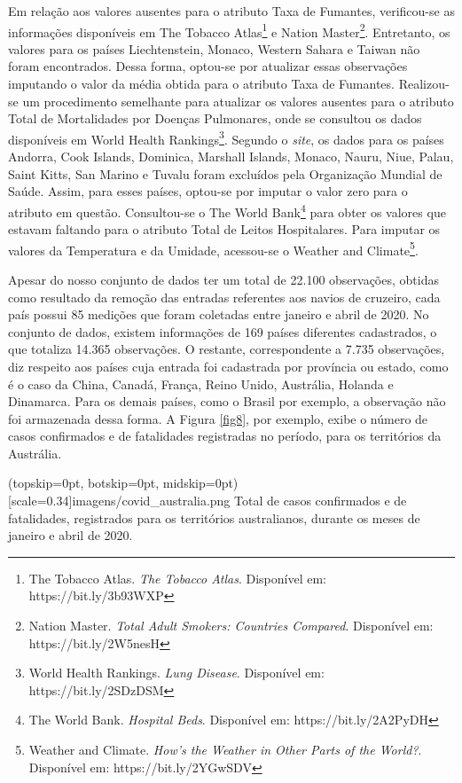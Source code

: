 \documentclass{ieeeaccess}
\begin{document}
Em relação aos valores ausentes para o atributo Taxa de Fumantes, verificou-se as informações disponíveis em The Tobacco Atlas\footnote{The Tobacco Atlas. \textit{The Tobacco Atlas}. Disponível em: https://bit.ly/3b93WXP} e Nation Master\footnote{Nation Master. \textit{Total Adult Smokers: Countries Compared}. Disponível em: https://bit.ly/2W5nesH}. Entretanto, os valores para os países Liechtenstein, Monaco, Western Sahara e Taiwan não foram encontrados. Dessa forma, optou-se por atualizar essas observações imputando o valor da média obtida para o atributo Taxa de Fumantes. Realizou-se um procedimento semelhante para atualizar os valores ausentes para o atributo Total de Mortalidades por Doenças Pulmonares, onde se consultou os dados disponíveis em World Health Rankings\footnote{World Health Rankings. \textit{Lung Disease}. Disponível em: https://bit.ly/2SDzDSM}. Segundo o \textit{site}, os dados para os países Andorra, Cook Islands, Dominica, Marshall Islands, Monaco, Nauru, Niue, Palau, Saint Kitts, San Marino e Tuvalu foram excluídos pela Organização Mundial de Saúde. Assim, para esses países, optou-se por imputar o valor zero para o atributo em questão. Consultou-se o The World Bank\footnote{The World Bank. \textit{Hospital Beds}. Disponível em: https://bit.ly/2A2PyDH} para obter os valores que estavam faltando para o atributo Total de Leitos Hospitalares. Para imputar os valores da Temperatura e da Umidade, acessou-se o Weather and Climate\footnote{Weather and Climate. \textit{How's the Weather in Other Parts of the World?}. Disponível em: https://bit.ly/2YGwSDV}.

Apesar do nosso conjunto de dados ter um total de 22.100 observações, obtidas como resultado da remoção das entradas referentes aos navios de cruzeiro, cada país possui 85 medições que foram coletadas entre janeiro e abril de 2020. No conjunto de dados, existem informações de 169 países diferentes cadastrados, o que totaliza 14.365 observações. O restante, correspondente a 7.735 observações, diz respeito aos países cuja entrada foi cadastrada por província ou estado, como é o caso da China, Canadá, França, Reino Unido, Austrália, Holanda e Dinamarca. Para os demais países, como o Brasil por exemplo, a observação não foi armazenada dessa forma. A Figura \ref{fig8}, por exemplo, exibe o número de casos confirmados e de fatalidades registradas no período, para os territórios da Austrália. 

\Figure[t!](topskip=0pt, botskip=0pt, midskip=0pt)[scale=0.34]{imagens/{covid_australia.png}}
{Total de casos confirmados e de fatalidades, registrados para os territórios australianos, durante os meses de janeiro e abril de 2020.  \label{fig8}}
\end{document}

